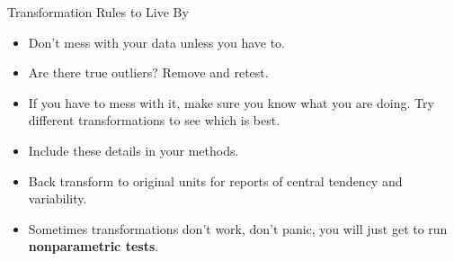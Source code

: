 \documentclass[
  ignorenonframetext,
]{beamer}
\providecommand{\tightlist}{%
  \setlength{\itemsep}{0pt}\setlength{\parskip}{0pt}}
\begin{document}
\begin{frame}{Transformation Rules to Live By}
\label{transformation-rules-to-live-by-1}
\begin{itemize}
\tightlist
\item
  Don't mess with your data unless you have to.
\end{itemize}

\begin{itemize}
\tightlist
\item
  Are there true outliers? Remove and retest.
\end{itemize}

\begin{itemize}
\tightlist
\item
  If you have to mess with it, make sure you know what you are doing.
  Try different transformations to see which is best.
\end{itemize}

\begin{itemize}
\tightlist
\item
  Include these details in your methods.
\end{itemize}

\begin{itemize}
\tightlist
\item
  Back transform to original units for reports of central tendency and
  variability.
\end{itemize}

\begin{itemize}
\tightlist
\item
  Sometimes transformations don't work, don't panic, you will just get
  to run \textbf{nonparametric tests}.
\end{itemize}
\end{frame}
\end{document}
